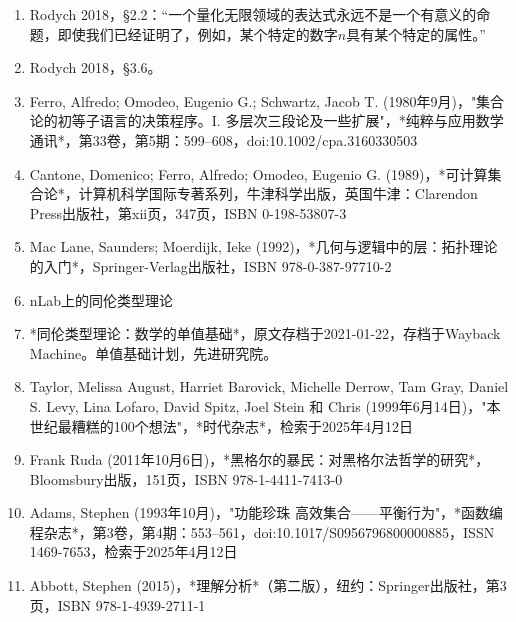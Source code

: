 \begin{enumerate}
\item Rodych 2018，§2.2：“一个量化无限领域的表达式永远不是一个有意义的命题，即使我们已经证明了，例如，某个特定的数字$n$具有某个特定的属性。”  
\item Rodych 2018，§3.6。  
\item Ferro, Alfredo; Omodeo, Eugenio G.; Schwartz, Jacob T. (1980年9月)，"集合论的初等子语言的决策程序。I. 多层次三段论及一些扩展"，*纯粹与应用数学通讯*，第33卷，第5期：599–608，doi:10.1002/cpa.3160330503
\item Cantone, Domenico; Ferro, Alfredo; Omodeo, Eugenio G. (1989)，*可计算集合论*，计算机科学国际专著系列，牛津科学出版，英国牛津：Clarendon Press出版社，第xii页，347页，ISBN 0-198-53807-3  
\item Mac Lane, Saunders; Moerdijk, Ieke (1992)，*几何与逻辑中的层：拓扑理论的入门*，Springer-Verlag出版社，ISBN 978-0-387-97710-2  
\item nLab上的同伦类型理论
\item *同伦类型理论：数学的单值基础*，原文存档于2021-01-22，存档于Wayback Machine。单值基础计划，先进研究院。
\item Taylor, Melissa August, Harriet Barovick, Michelle Derrow, Tam Gray, Daniel S. Levy, Lina Lofaro, David Spitz, Joel Stein 和 Chris (1999年6月14日)，"本世纪最糟糕的100个想法"，*时代杂志*，检索于2025年4月12日
\item Frank Ruda (2011年10月6日)，*黑格尔的暴民：对黑格尔法哲学的研究*，Bloomsbury出版，151页，ISBN 978-1-4411-7413-0
\item Adams, Stephen (1993年10月)，"功能珍珠 高效集合——平衡行为"，*函数编程杂志*，第3卷，第4期：553–561，doi:10.1017/S0956796800000885，ISSN 1469-7653，检索于2025年4月12日  
\item Abbott, Stephen (2015)，*理解分析*（第二版），纽约：Springer出版社，第3页，ISBN 978-1-4939-2711-1
\end{enumerate}
